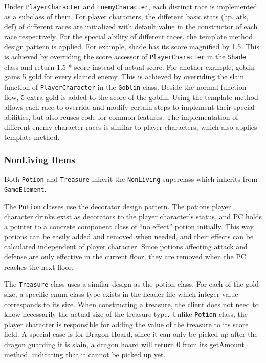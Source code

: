 \documentclass[11pt]{article}
\theoremstyle{plain} \newtheorem{theorem*}{Theorem}[subsection]
\begin{document}
Under \texttt{PlayerCharacter} and \texttt{EnemyCharacter}, each distinct race
is implemented as a subclass of them.  For player characters, the different
basic stats (hp, atk, def) of different races are initialized with default
value in the constructor of each race respectively.  For the special ability of
different races, the template method design pattern is applied. For example,
shade has its score magnified by 1.5. This is achieved by overriding the score
accessor of \texttt{PlayerCharacter} in the \texttt{Shade} class and return 1.5
* score instead of actual score. For another example, goblin gains 5 gold for
every slained enemy. This is achieved by overriding the \textsf{slain} function
of \texttt{PlayerCharacter} in the \texttt{Goblin} class.  Beside the normal
function flow, 5 extra gold is added to the score of the goblin.  Using the
template method allows each race to override and modify certain steps to
implement their special abilities, but also reuses code for common features.
The implementation of different enemy character races is similar to player
characters, which also applies template method.

\subsubsection{NonLiving Items}

Both \texttt{Potion} and \texttt{Treasure} inherit the \texttt{NonLiving}
superclass which inherits from \texttt{GameElement}.

The \texttt{Potion} classes use the decorator design pattern.  The potions
player character drinks exist as decorators to the player character’s status,
and PC holds a pointer to a concrete component class of “no effect” potion
initially.  This way potions can be easily added and removed when needed, and
their effects can be calculated independent of player character. Since potions
affecting attack and defense are only effective in the current floor, they are
removed when the PC reaches the next floor.  

The \texttt{Treasure} class uses a similar design as the potion class. For each
of the gold size, a specific enum class type exists in the header file which
integer value corresponds to its size. When constructing a treasure, the client
does not need to know necessarily the actual size of the treasure type. Unlike
\texttt{Potion} class, the player character is responsible for adding the value
of the treasure to its score field. A special case is for Dragon Hoard, since
it can only be picked up after the dragon guarding it is slain, a dragon hoard
will return 0 from its \textsf{getAmount} method, indicating that it cannot be
picked up yet.  
\end{document}
